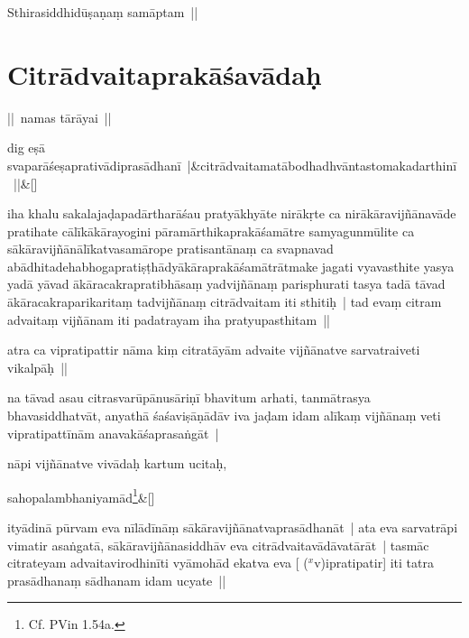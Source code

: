 \documentclass[article,12pt,a4paper]{memoir}
\newcommand{\corr}[1]{($^{x}$#1)}
\begin{document}
	  \pstart Sthirasiddhidūṣaṇaṃ samāptam || 
	\pend
      
	  
	
\chapter[{Citrādvaitaprakāśavādaḥ}]{Citrādvaitaprakāśavādaḥ}\label{Citrādvaitaprakāśavādaḥ}

	  \pstart || namas tārāyai || 
	\pend
      
	    
	    \stanza[\smallbreak]
	dig eṣā svaparāśeṣaprativādiprasādhanī |&citrādvaitamatābodhadhvāntastomakadarthinī ||\&[\smallbreak]


	

	  \pstart iha khalu sakalajaḍapadārtharāśau pratyākhyāte nirākṛte ca nirākāravijñānavāde pratihate cālīkākārayogini pāramārthikaprakāśamātre samyagunmūlite ca sākāravijñānālīkatvasamārope pratisantānaṃ ca svapnavad abādhitadehabhogapratiṣṭhādyākāraprakāśamātrātmake jagati vyavasthite yasya yadā yāvad ākāracakrapratibhāsaṃ yadvijñānaṃ parisphurati tasya tadā tāvad ākāracakraparikaritaṃ tadvijñānaṃ citrādvaitam iti sthitiḥ | tad evaṃ citram advaitaṃ vijñānam iti padatrayam iha pratyupasthitam || 
	\pend
      

	  \pstart atra ca vipratipattir nāma kiṃ citratāyām advaite vijñānatve sarvatraiveti vikalpāḥ || 
	\pend
      

	  \pstart na tāvad asau citrasvarūpānusāriṇī bhavitum arhati, tanmātrasya bhavasiddhatvāt, anyathā śaśaviṣāṇādāv iva jaḍam idam alīkaṃ vijñānaṃ veti vipratipattīnām anavakāśaprasaṅgāt |
	\pend
      

	  \pstart nāpi vijñānatve vivādaḥ kartum ucitaḥ,
	\pend
      
	    
	    \stanza[\smallbreak]
	sahopalambhaniyamād\footnote{Cf. PVin 1.54a.}\&[\smallbreak]


	

	  \pstart ityādinā pūrvam eva nīlādīnāṃ sākāravijñānatvaprasādhanāt | ata eva sarvatrāpi vimatir asaṅgatā, sākāravijñānasiddhāv eva citrādvaitavādāvatārāt | tasmāc citrateyam advaitavirodhinīti vyāmohād ekatva eva [ {\corr vipratipatir}] iti tatra prasādhanaṃ sādhanam idam ucyate ||
	\pend
      
\end{document}
